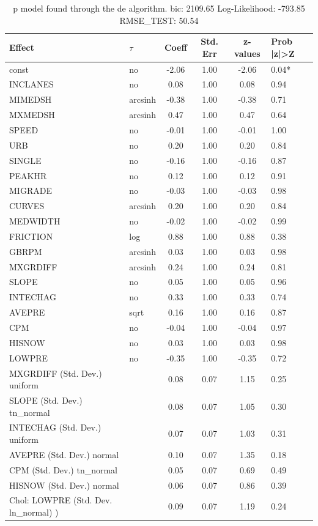 \begin{table}
	\caption{p model found through the de algorithm. bic: 2109.65 Log-Likelihood: -793.85 RMSE_TEST: 50.54}
	\begin{center}
		\begin{tabular}{|l|l|c|c|c|l|}
			\hline
			Effect & $\tau$ & Coeff & Std. Err & z-values & Prob |z|>Z \\
			\hline
			const & no & -2.06 & 1.00 & -2.06 & 0.04* \\
			\hline
			INCLANES & no & 0.08 & 1.00 & 0.08 & 0.94 \\
			\hline
			MIMEDSH & arcsinh & -0.38 & 1.00 & -0.38 & 0.71 \\
			\hline
			MXMEDSH & arcsinh & 0.47 & 1.00 & 0.47 & 0.64 \\
			\hline
			SPEED & no & -0.01 & 1.00 & -0.01 & 1.00 \\
			\hline
			URB & no & 0.20 & 1.00 & 0.20 & 0.84 \\
			\hline
			SINGLE & no & -0.16 & 1.00 & -0.16 & 0.87 \\
			\hline
			PEAKHR & no & 0.12 & 1.00 & 0.12 & 0.91 \\
			\hline
			MIGRADE & no & -0.03 & 1.00 & -0.03 & 0.98 \\
			\hline
			CURVES & arcsinh & 0.20 & 1.00 & 0.20 & 0.84 \\
			\hline
			MEDWIDTH & no & -0.02 & 1.00 & -0.02 & 0.99 \\
			\hline
			FRICTION & log & 0.88 & 1.00 & 0.88 & 0.38 \\
			\hline
			GBRPM & arcsinh & 0.03 & 1.00 & 0.03 & 0.98 \\
			\hline
			MXGRDIFF & arcsinh & 0.24 & 1.00 & 0.24 & 0.81 \\
			\hline
			SLOPE & no & 0.05 & 1.00 & 0.05 & 0.96 \\
			\hline
			INTECHAG & no & 0.33 & 1.00 & 0.33 & 0.74 \\
			\hline
			AVEPRE & sqrt & 0.16 & 1.00 & 0.16 & 0.87 \\
			\hline
			CPM & no & -0.04 & 1.00 & -0.04 & 0.97 \\
			\hline
			HISNOW & no & 0.03 & 1.00 & 0.03 & 0.98 \\
			\hline
			LOWPRE & no & -0.35 & 1.00 & -0.35 & 0.72 \\
			\hline
			MXGRDIFF (Std. Dev.) uniform &  & 0.08 & 0.07 & 1.15 & 0.25 \\
			\hline
			SLOPE (Std. Dev.) tn_normal &  & 0.08 & 0.07 & 1.05 & 0.30 \\
			\hline
			INTECHAG (Std. Dev.) uniform &  & 0.07 & 0.07 & 1.03 & 0.31 \\
			\hline
			AVEPRE (Std. Dev.) normal &  & 0.10 & 0.07 & 1.35 & 0.18 \\
			\hline
			CPM (Std. Dev.) tn_normal &  & 0.05 & 0.07 & 0.69 & 0.49 \\
			\hline
			HISNOW (Std. Dev.) normal &  & 0.06 & 0.07 & 0.86 & 0.39 \\
			\hline
			 Chol: LOWPRE (Std. Dev. ln_normal) ) &  & 0.09 & 0.07 & 1.19 & 0.24 \\
			\hline
		\end{tabular}
	\end{center}
\end{table}
